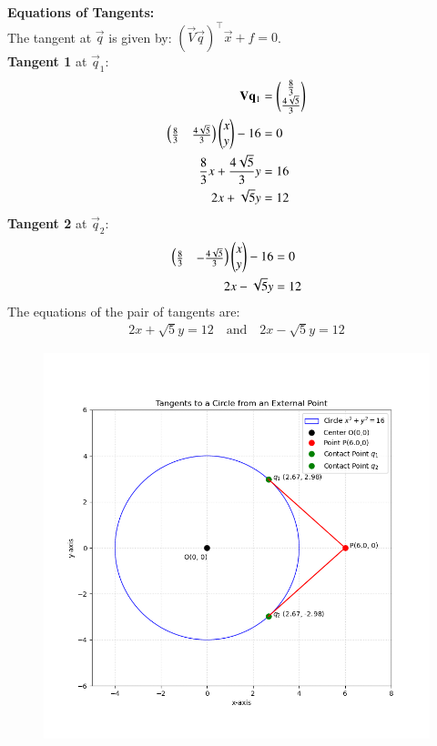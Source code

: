 \documentclass[article]{IEEEtran}
\begin{document}
	\textbf{Equations of Tangents:}\\
	The tangent at $\vec{q}$ is given by: $(\vec{V}\vec{q})^\top \vec{x} + f = 0$.\\
	\textbf{Tangent 1} at $\vec{q}_1$:
	\begin{align}
		\mathbf{V}\mathbf{q}_1 &= \begin{pmatrix}\frac{8}{3}\\\frac{4\sqrt{5}}{3}\end{pmatrix}\\
		\begin{pmatrix}\frac{8}{3} & \frac{4\sqrt{5}}{3}\end{pmatrix}\begin{pmatrix}x\\y\end{pmatrix} - 16 &= 0\\
		\frac{8}{3}x + \frac{4\sqrt{5}}{3}y &= 16\\
		2x + \sqrt{5}y &= 12
	\end{align}	
	\textbf{Tangent 2} at $\vec{q}_2$:
	\begin{align}
		\begin{pmatrix}\frac{8}{3} & -\frac{4\sqrt{5}}{3}\end{pmatrix}\begin{pmatrix}x\\y\end{pmatrix} - 16 &= 0\\
		2x - \sqrt{5}y &= 12
	\end{align}
The equations of the pair of tangents are:
	\begin{align}
		\boxed{2x + \sqrt{5}y = 12 \quad \text{and} \quad 2x - \sqrt{5}y = 12}
	\end{align}
	
	\begin{figure}[H]
		\centering
		\includegraphics[width=1.1\linewidth]{figs/tangents_plot}
	\end{figure}
	
\end{document}
